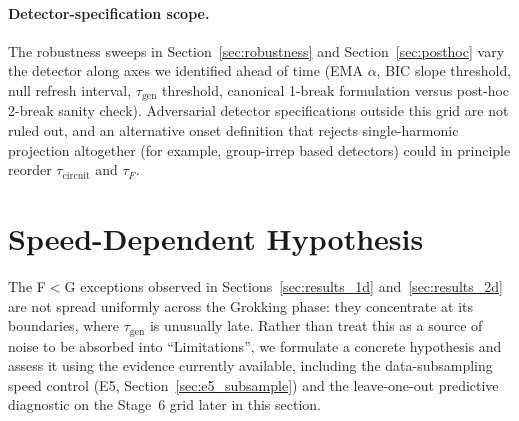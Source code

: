 \documentclass{article}
\newcommand{\taug}{\tau_{\mathrm{gen}}}
\newcommand{\tauf}{\tau_{F}}
\newcommand{\taucirc}{\tau_{\mathrm{circuit}}}
\begin{document}
\paragraph{Detector-specification scope.}
The robustness sweeps in Section~\ref{sec:robustness} and
Section~\ref{sec:posthoc} vary the detector along axes we
identified ahead of time (EMA $\alpha$, BIC slope threshold, null
refresh interval, $\taug$ threshold, canonical 1-break formulation versus post-hoc 2-break sanity check).
Adversarial detector specifications outside this grid are not
ruled out, and an alternative onset definition that rejects
single-harmonic projection altogether (for example, group-irrep
based detectors) could in principle reorder $\taucirc$ and $\tauf$.

\section{Speed-Dependent Hypothesis}
\label{app:speed_extended}


The F$<$G exceptions observed in Sections~\ref{sec:results_1d}
and~\ref{sec:results_2d} are not spread uniformly across the
Grokking phase: they concentrate at its boundaries, where $\taug$
is unusually late.
Rather than treat this as a source of noise to be absorbed into
``Limitations'', we formulate a concrete hypothesis and assess it
using the evidence currently available, including the
data-subsampling speed control (E5, Section~\ref{sec:e5_subsample})
and the leave-one-out predictive diagnostic on the Stage~6 grid
later in this section.
\end{document}
